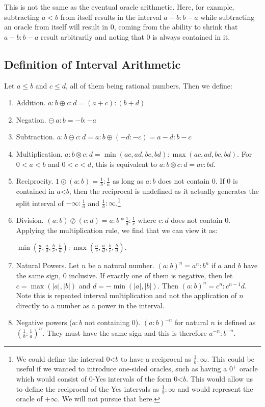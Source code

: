\documentclass[12pt]{article}
\theoremstyle{remark}
\newcommand{\lt}{\mathord{<}}
\begin{document}
This is not the same as the eventual oracle arithmetic. Here, for example, subtracting $a<b$ from itself results in the interval $a-b:b-a$ while subtracting an oracle from itself will result in $0$, coming from the ability to shrink that $a-b:b-a$ result arbitrarily and noting that $0$ is always contained in it. 

\subsection{Definition of Interval Arithmetic}

Let $a \leq b$ and $c \leq d$, all of them being rational numbers. Then we define:
\begin{enumerate}
    \item Addition. $a:b \oplus c:d = (a+c):(b+d)$
    \item Negation. $\ominus\ a:b = -b:-a$
    \item Subtraction. $a:b \ominus c:d = a:b \oplus (-d:-c) = a-d:b-c$
    \item Multiplication. $a:b \otimes c:d = \min(ac, ad, bc, bd): \max(ac,ad,bc,bd)$. For $0<a<b$ and $0<c<d$, this is equivalent to $a:b \otimes c:d = ac:bd$. 
    \item Reciprocity. $1 \oslash (a:b) = \frac{1}{b}:\frac{1}{a}$ as long as $a:b$ does not contain 0. If 0 is contained in $a \lt b$, then the reciprocal is undefined as it actually generates the split interval of $-\infty:\frac{1}{a}$ and $\frac{1}{b}:\infty$.\footnote{We could define the interval $0 \lt b$ to have a reciprocal as $\frac{1}{b}:\infty$. This could be useful if we wanted to introduce one-sided oracles, such as having a $0^+$ oracle which would consist of $0$-Yes intervals of the form $0\lt b$. This would allow us to define the reciprocal of the Yes intervals as $\frac{1}{b}:\infty$ and would represent the oracle of $+ \infty$. We will not pursue that here.  }
    \item Division. $(a:b) \oslash (c:d) = a:b * \frac{1}{d}:\frac{1}{c}$ where $c:d$ does not contain 0. Applying the multiplication rule, we find that we can view it as:
    
    $\min(\frac{a}{c}, \frac{a}{d}, \frac{b}{c}, \frac{b}{d}): \max(\frac{a}{c},\frac{a}{d},\frac{b}{c},\frac{b}{d})$. 
    \item Natural Powers. Let $n$ be a natural number. $(a:b)^n = a^n:b^n$ if $a$ and $b$ have the same sign, 0 inclusive. If exactly one of them is negative, then let $c = \max (|a|, |b|)$ and $d=-\min(|a|, |b|)$. Then $(a:b)^n = c^n: c^{n-1}d $. Note this is repeated interval multiplication and not the application of $n$ directly to a number as a power in the interval. 
    \item Negative powers ($a:b$ not containing 0). $(a:b)^{-n}$ for natural $n$ is defined as $(\frac{1}{b}:\frac{1}{a})^n$. They must have the same sign and this is therefore $a^{-n} : b^{-n}$.
\end{enumerate}
\end{document}
